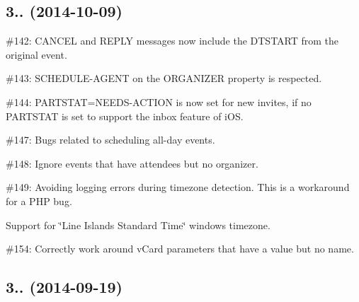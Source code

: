 \subsection*{3.. (2014-\/10-\/09) }


\begin{DoxyItemize}
\item \#142\+: {\ttfamily C\+A\+N\+C\+EL} and {\ttfamily R\+E\+P\+LY} messages now include the {\ttfamily D\+T\+S\+T\+A\+RT} from the original event.
\item \#143\+: {\ttfamily S\+C\+H\+E\+D\+U\+L\+E-\/\+A\+G\+E\+NT} on the {\ttfamily O\+R\+G\+A\+N\+I\+Z\+ER} property is respected.
\item \#144\+: {\ttfamily P\+A\+R\+T\+S\+T\+AT=N\+E\+E\+D\+S-\/\+A\+C\+T\+I\+ON} is now set for new invites, if no {\ttfamily P\+A\+R\+T\+S\+T\+AT} is set to support the inbox feature of i\+OS.
\item \#147\+: Bugs related to scheduling all-\/day events.
\item \#148\+: Ignore events that have attendees but no organizer.
\item \#149\+: Avoiding logging errors during timezone detection. This is a workaround for a P\+HP bug.
\item Support for \char`\"{}\+Line Islands Standard Time\char`\"{} windows timezone.
\item \#154\+: Correctly work around v\+Card parameters that have a value but no name.
\end{DoxyItemize}

\subsection*{3.. (2014-\/09-\/19) }


